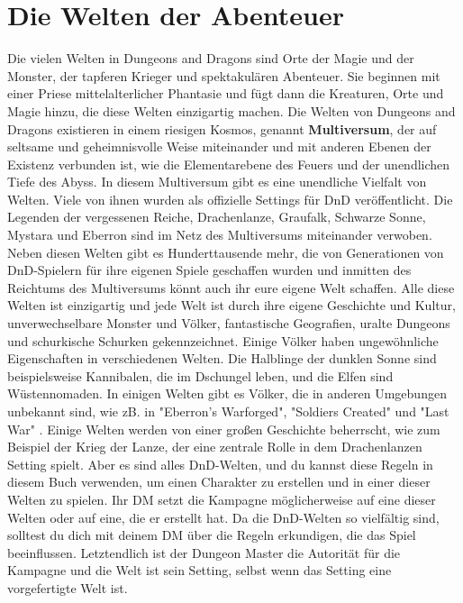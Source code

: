 \section{Die Welten der Abenteuer}
Die vielen Welten in Dungeons and Dragons sind Orte der Magie und der Monster, der tapferen Krieger und spektakulären Abenteuer. Sie beginnen mit einer Priese mittelalterlicher Phantasie und fügt dann die Kreaturen, Orte und Magie hinzu, die diese Welten einzigartig machen.
Die Welten von Dungeons and Dragons existieren in einem riesigen Kosmos, genannt \textbf{Multiversum}, der auf seltsame und geheimnisvolle Weise miteinander und mit anderen Ebenen der Existenz verbunden ist, wie die Elementarebene des Feuers und der unendlichen Tiefe des Abyss. In diesem Multiversum gibt es eine unendliche Vielfalt von Welten.
Viele von ihnen wurden als offizielle Settings für DnD veröffentlicht. Die Legenden der vergessenen Reiche, Drachenlanze, Graufalk, Schwarze Sonne, Mystara und Eberron sind im Netz des Multiversums miteinander verwoben. Neben diesen Welten gibt es Hunderttausende mehr, die von Generationen von DnD-Spielern für ihre eigenen Spiele geschaffen wurden und inmitten des Reichtums des Multiversums könnt auch ihr eure eigene Welt schaffen.
Alle diese Welten ist einzigartig und jede Welt ist durch ihre eigene Geschichte und Kultur, unverwechselbare Monster und Völker, fantastische Geografien, uralte Dungeons und schurkische Schurken gekennzeichnet. Einige Völker haben ungewöhnliche Eigenschaften in verschiedenen Welten. Die Halblinge der dunklen Sonne sind beispielsweise Kannibalen, die im Dschungel leben, und die Elfen sind Wüstennomaden. In einigen Welten gibt es Völker, die in anderen Umgebungen unbekannt sind, wie zB. in "Eberron’s Warforged", "Soldiers Created" und "Last War"  . Einige Welten werden von einer großen Geschichte beherrscht, wie zum Beispiel der Krieg der Lanze, der eine zentrale Rolle in dem Drachenlanzen Setting spielt. Aber es sind alles DnD-Welten, und du kannst diese Regeln in diesem Buch verwenden, um einen Charakter zu erstellen und in einer dieser Welten zu spielen. Ihr DM setzt die Kampagne möglicherweise auf eine dieser Welten oder auf eine, die er erstellt hat. Da die DnD-Welten so vielfältig sind, solltest du dich mit deinem DM über die Regeln erkundigen, die das Spiel beeinflussen. Letztendlich ist der Dungeon Master die Autorität für die Kampagne und die Welt ist sein Setting, selbst wenn das Setting eine vorgefertigte Welt ist.
\newpage
